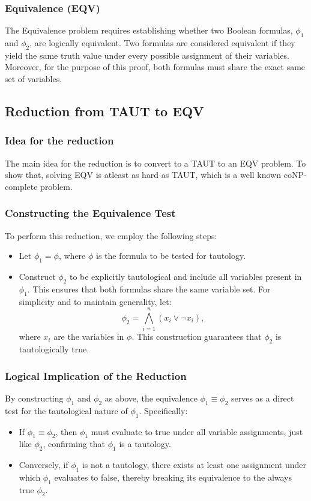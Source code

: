 \documentclass{article}
\begin{document}
\subsubsection*{Equivalence (EQV)}
The Equivalence problem requires establishing whether two Boolean formulas, $\phi_1$ and $\phi_2$, are logically equivalent. Two formulas are considered equivalent if they yield the same truth value under every possible assignment of their variables. Moreover, for the purpose of this proof, both formulas must share the exact same set of variables.

\subsection*{Reduction from TAUT to EQV}

\subsubsection*{Idea for the reduction}
The main idea for the reduction is to convert to a TAUT to an EQV problem. To
show that, solving EQV is atleast as hard as TAUT, which is a well known
coNP-complete problem.

\subsubsection*{Constructing the Equivalence Test}
To perform this reduction, we employ the following steps:
\begin{itemize}
  \item Let $\phi_1 = \phi$, where $\phi$ is the formula to be tested for tautology.
  \item Construct $\phi_2$ to be explicitly tautological and include all variables present in $\phi_1$. This ensures that both formulas share the same variable set. For simplicity and to maintain generality, let:
    \[
    \phi_2 = \bigwedge_{i=1}^{n} (x_i \lor \lnot x_i),
    \]
    where $x_i$ are the variables in $\phi$. This construction guarantees that $\phi_2$ is tautologically true.
\end{itemize}

\subsubsection*{Logical Implication of the Reduction}
By constructing $\phi_1$ and $\phi_2$ as above, the equivalence $\phi_1 \equiv \phi_2$ serves as a direct test for the tautological nature of $\phi_1$. Specifically:
\begin{itemize}
  \item If $\phi_1 \equiv \phi_2$, then $\phi_1$ must evaluate to true under all variable assignments, just like $\phi_2$, confirming that $\phi_1$ is a tautology.
  \item Conversely, if $\phi_1$ is not a tautology, there exists at least one assignment under which $\phi_1$ evaluates to false, thereby breaking its equivalence to the always true $\phi_2$.
\end{itemize}
\end{document}
